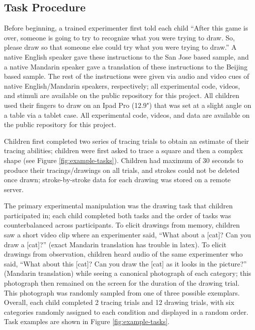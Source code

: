 \documentclass[
  english,
  man]{apa6}
\begin{document}
\hypertarget{task-procedure}{%
\subsection{Task Procedure}\label{task-procedure}}

Before beginning, a trained experimenter first told each child \enquote{After this game is over, someone is going to try to recognize what you were trying to draw. So, please draw so that someone else could try what you were trying to draw.} A native English speaker gave these instructions to the San Jose based sample, and a native Mandarin speaker gave a translation of these instructions to the Beijing based sample. The rest of the instructions were given via audio and video cues of native English/Mandarin speakers, respectively; all experimental code, videos, and stimuli are available on the public repository for this project. All children used their fingers to draw on an Ipad Pro (12.9") that was set at a slight angle on a table via a tablet case. All experimental code, videos, and data are available on the public repository for this project.

Children first completed two series of tracing trials to obtain an estimate of their tracing abilities; children were first asked to trace a square and then a complex shape (see Figure \ref{fig:example-tasks}). Children had maximum of 30 seconds to produce their tracings/drawings on all trials, and strokes could not be deleted once drawn; stroke-by-stroke data for each drawing was stored on a remote server.

The primary experimental manipulation was the drawing task that children participated in; each child completed both tasks and the order of tasks was counterbalanced across participants. To elicit drawings from memory, children saw a short video clip where an experimenter said, \enquote{What about a {[}cat{]}? Can you draw a {[}cat{]}?} (exact Mandarin translation has trouble in latex). To elicit drawings from observation, children heard audio of the same experimenter who said, \enquote{What about this {[}cat{]}? Can you draw the {[}cat{]} as it looks in the picture?} (Mandarin translation) while seeing a canonical photograph of each category; this photograph then remained on the screen for the duration of the drawing trial. This photograph was randomly sampled from one of three possible exemplars. Overall, each child completed 2 tracing trials and 12 drawing trials, with six categories randomly assigned to each condition and displayed in a random order. Task examples are shown in Figure \ref{fig:example-tasks}.
\end{document}
